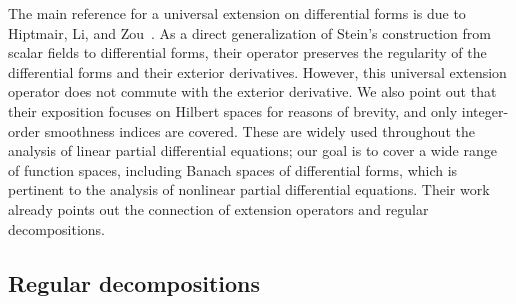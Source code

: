 \documentclass[10pt,a4paper]{amsart}
\theoremstyle{definition}
\theoremstyle{remark}
\numberwithin{equation}{section}
\begin{document}
The main reference for a universal extension on differential forms is due to Hiptmair, Li, and Zou~\cite{hiptmair2012universal}. 
As a direct generalization of Stein's construction from scalar fields to differential forms,
their operator preserves the regularity of the differential forms and their exterior derivatives. 
However, this universal extension operator does not commute with the exterior derivative. 
We also point out that their exposition focuses on Hilbert spaces for reasons of brevity, and only integer-order smoothness indices are covered.
These are widely used throughout the analysis of linear partial differential equations; 
our goal is to cover a wide range of function spaces, including Banach spaces of differential forms, which is pertinent to the analysis of nonlinear partial differential equations.
Their work already points out the connection of extension operators and regular decompositions.

\subsection{Regular decompositions}
\end{document}
